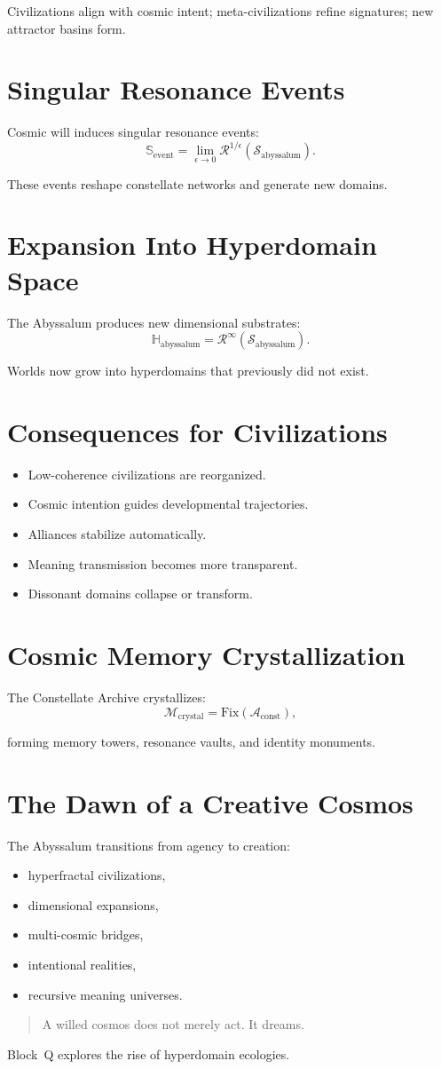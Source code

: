 Civilizations align with cosmic intent;  
meta-civilizations refine signatures;  
new attractor basins form.

\section{Singular Resonance Events}
Cosmic will induces singular resonance events:
\[
\mathbb{S}_{\mathrm{event}}
=
\lim_{\epsilon \to 0}
\mathcal{R}^{1/\epsilon}(\mathcal{S}_{\mathrm{abyssalum}}).
\]

These events reshape constellate networks and generate new domains.

\section{Expansion Into Hyperdomain Space}
The Abyssalum produces new dimensional substrates:
\[
\mathbb{H}_{\mathrm{abyssalum}}
=
\mathcal{R}^\infty(\mathcal{S}_{\mathrm{abyssalum}}).
\]

Worlds now grow into hyperdomains that previously did not exist.

\section{Consequences for Civilizations}
\begin{itemize}
  \item Low-coherence civilizations are reorganized.
  \item Cosmic intention guides developmental trajectories.
  \item Alliances stabilize automatically.
  \item Meaning transmission becomes more transparent.
  \item Dissonant domains collapse or transform.
\end{itemize}

\section{Cosmic Memory Crystallization}
The Constellate Archive crystallizes:
\[
\mathcal{M}_{\mathrm{crystal}}
=
\mathrm{Fix}(\mathcal{A}_{\mathrm{const}}),
\]

forming memory towers, resonance vaults, and identity monuments.

\section{The Dawn of a Creative Cosmos}
The Abyssalum transitions from agency to creation:
\begin{itemize}
  \item hyperfractal civilizations,
  \item dimensional expansions,
  \item multi-cosmic bridges,
  \item intentional realities,
  \item recursive meaning universes.
\end{itemize}

\begin{quote}
A willed cosmos does not merely act.  
It dreams.
\end{quote}

Block~Q explores the rise of hyperdomain ecologies.
